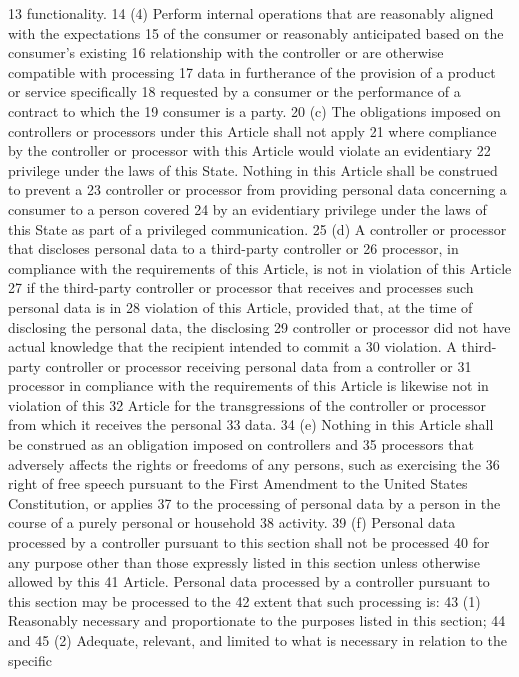 13 functionality.
14 (4) Perform internal operations that are reasonably aligned with the expectations
15 of the consumer or reasonably anticipated based on the consumer's existing
16 relationship with the controller or are otherwise compatible with processing
17 data in furtherance of the provision of a product or service specifically
18 requested by a consumer or the performance of a contract to which the
19 consumer is a party.
20 (c) The obligations imposed on controllers or processors under this Article shall not apply
21 where compliance by the controller or processor with this Article would violate an evidentiary
22 privilege under the laws of this State. Nothing in this Article shall be construed to prevent a
23 controller or processor from providing personal data concerning a consumer to a person covered
24 by an evidentiary privilege under the laws of this State as part of a privileged communication.
25 (d) A controller or processor that discloses personal data to a third-party controller or
26 processor, in compliance with the requirements of this Article, is not in violation of this Article
27 if the third-party controller or processor that receives and processes such personal data is in
28 violation of this Article, provided that, at the time of disclosing the personal data, the disclosing
29 controller or processor did not have actual knowledge that the recipient intended to commit a
30 violation. A third-party controller or processor receiving personal data from a controller or
31 processor in compliance with the requirements of this Article is likewise not in violation of this
32 Article for the transgressions of the controller or processor from which it receives the personal
33 data.
34 (e) Nothing in this Article shall be construed as an obligation imposed on controllers and
35 processors that adversely affects the rights or freedoms of any persons, such as exercising the
36 right of free speech pursuant to the First Amendment to the United States Constitution, or applies
37 to the processing of personal data by a person in the course of a purely personal or household
38 activity.
39 (f) Personal data processed by a controller pursuant to this section shall not be processed
40 for any purpose other than those expressly listed in this section unless otherwise allowed by this
41 Article. Personal data processed by a controller pursuant to this section may be processed to the
42 extent that such processing is:
43 (1) Reasonably necessary and proportionate to the purposes listed in this section;
44 and
45 (2) Adequate, relevant, and limited to what is necessary in relation to the specific

